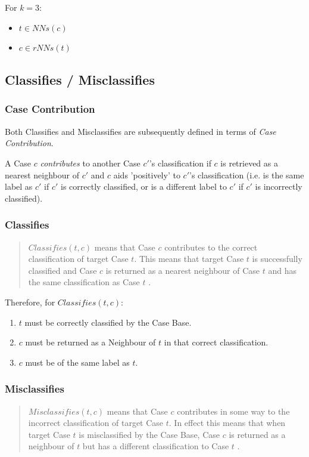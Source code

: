 \documentclass[a4paper,11pt]{report}
\begin{document}
For $k=3$:
\begin{itemize}
	\item $ t \in NNs(c) $
	\item $ c \in rNNs(t) $
\end{itemize}

\subsection{Classifies / Misclassifies}
\subsubsection{Case Contribution\label{sec:contributes}}
Both Classifies and Misclassifies are subsequently defined in terms of \emph{Case Contribution}.

A Case $c$ \emph{contributes} to another Case $c'$'s classification if $c$ is retrieved as a nearest neighbour of $c'$ and $c$ aids 'positively' to $c'$'s classification (i.e. is the same label as $c'$ if $c'$ is correctly classified, or is a different label to  $c'$ if  $c'$ is incorrectly classified).
\subsubsection{Classifies}
\begin{quote}
$ Classifies(t, c) $ means that Case $c$ contributes to the correct classification of target Case $t$. This means that target Case $t$ is successfully classified and Case $c$ is returned as a nearest neighbour of Case $t$ and has the same classification as Case $t$ \citep{Delany2009}.
\end{quote}

Therefore, for $ Classifies(t, c) $:
\begin{enumerate}
	\item $t$ must be correctly classified by the Case Base.
	\item $c$ must be returned as a Neighbour of $t$ in that correct classification.
	\item $c$ must be of the same label as $t$.
\end{enumerate}

\subsubsection{Misclassifies}

\begin{quote}
$ Misclassifies(t, c ) $ means that Case $c$ contributes in some way to the incorrect classification of target Case $t$. In effect this means that when target Case $t$ is misclassified by the Case Base, Case $c$ is returned as a neighbour of $t$ but has a different classification to Case $t$ \citep{Delany2009}.
\end{quote}
\end{document}
